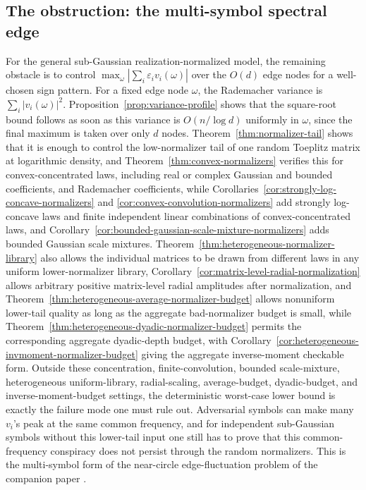 \documentclass[11pt]{amsart}
\numberwithin{equation}{section}
\theoremstyle{definition}
\theoremstyle{remark}
\newcommand{\abs}[1]{\left\lvert #1\right\rvert}
\newcommand{\eps}{\varepsilon}
\begin{document}
\subsection{The obstruction: the multi-symbol spectral edge}

For the general sub-Gaussian realization-normalized model, the remaining obstacle
is to control $\max_\omega\abs{\sum_i\eps_iv_i(\omega)}$ over the \(O(d)\) edge
nodes for a well-chosen sign pattern. For a fixed edge node \(\omega\), the
Rademacher variance is \(\sum_i\abs{v_i(\omega)}^2\).
Proposition~\ref{prop:variance-profile} shows that the square-root bound follows
as soon as this variance is \(O(n/\log d)\) uniformly in \(\omega\), since the
final maximum is taken over only \(d\) nodes.  Theorem~\ref{thm:normalizer-tail}
shows that it is enough to control the low-normalizer tail of one random
Toeplitz matrix at logarithmic density, and
Theorem~\ref{thm:convex-normalizers} verifies this for convex-concentrated laws,
including real or complex Gaussian and bounded coefficients, and Rademacher
coefficients, while Corollaries~\ref{cor:strongly-log-concave-normalizers} and
\ref{cor:convex-convolution-normalizers} add strongly log-concave laws and
finite independent linear combinations of convex-concentrated laws, and
Corollary~\ref{cor:bounded-gaussian-scale-mixture-normalizers} adds bounded
Gaussian scale mixtures.
Theorem~\ref{thm:heterogeneous-normalizer-library} also allows the individual
matrices to be drawn from different laws in any uniform lower-normalizer
library, Corollary~\ref{cor:matrix-level-radial-normalization} allows arbitrary
positive matrix-level radial amplitudes after normalization, and
Theorem~\ref{thm:heterogeneous-average-normalizer-budget} allows
nonuniform lower-tail quality as long as the aggregate bad-normalizer budget is
small, while Theorem~\ref{thm:heterogeneous-dyadic-normalizer-budget} permits
the corresponding aggregate dyadic-depth budget, with
Corollary~\ref{cor:heterogeneous-invmoment-normalizer-budget} giving the
aggregate inverse-moment checkable form.  Outside these concentration,
finite-convolution, bounded scale-mixture, heterogeneous uniform-library,
radial-scaling, average-budget, dyadic-budget, and inverse-moment-budget
settings, the deterministic
worst-case lower bound is exactly the failure mode one must rule out.
Adversarial symbols can make many \(v_i\)'s
peak at the same common frequency, and for independent sub-Gaussian symbols
without this lower-tail input one still has to prove that this common-frequency
conspiracy does not persist through the random normalizers.  This is the
multi-symbol form of the near-circle edge-fluctuation problem of the companion
paper \cite{Shmalo-paper5}.
\end{document}
